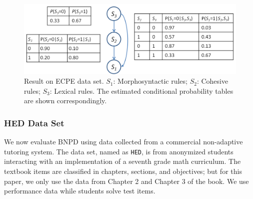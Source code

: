 \documentclass{edm_template}
\newcommand{\hl}[1]{\colorbox{yellow}{#1}}
\begin{document}
{			\begin{figure}[!th]
				\begin{center}
					\centering
					\includegraphics[width=1.0\linewidth]{figures/ecpe_results.png}
				\end{center}
				\caption{Result on ECPE data set. $S_1$: Morphosyntactic rules; $S_2$: Cohesive rules; $S_3$: Lexical rules. 
					The estimated conditional probability tables are shown correspondingly.}
				\label{fig:ecpe-result} 
			\end{figure}
	
	\subsubsection{HED Data Set}
	We now evaluate BNPD using data collected from a commercial non-adaptive tutoring system.
	The data set, named as \texttt{HED}, is from anonymized students interacting with an implementation of a seventh grade math curriculum.
	The textbook items are classified in chapters, sections, and objectives; but for this paper, we only use the data from Chapter 2 and Chapter 3 of the book.
	We use performance data while students solve test items.
	
	
	
}
\end{document}
